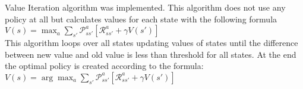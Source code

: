
Value Iteration algorithm was implemented. This algorithm does not use any policy at all but calculates values for each state with the following formula \\


\begin{math}
  V(s) = \max_a \sum_{s'} \mathcal{P}_{ss'}^a \left[\mathcal{R}_{ss'}^a + \gamma V(s') \right]
\end{math} \\

This algorithm loops over all states updating values of states until the difference between new value and old value is less than threshold for all states. At the end the optimal policy is created according to the formula: \\


\begin{math}
V(s) =\arg\max_a \sum_{s'} \mathcal{P}_{ss'}^a \left[\mathcal{R}_{ss'}^a + \gamma V(s') \right]
\end{math} \\